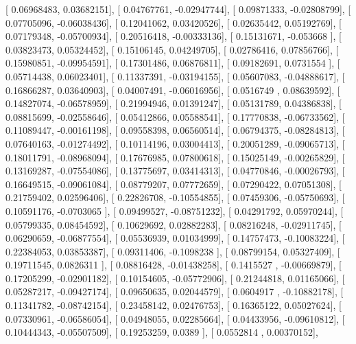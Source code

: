 \documentclass{article}
\begin{document}
       [ 0.06968483,  0.03682151],
       [ 0.04767761, -0.02947744],
       [ 0.09871333, -0.02808799],
       [ 0.07705096, -0.06038436],
       [ 0.12041062,  0.03420526],
       [ 0.02635442,  0.05192769],
       [ 0.07179348, -0.05700934],
       [ 0.20516418, -0.00333136],
       [ 0.15131671, -0.053668  ],
       [ 0.03823473,  0.05324452],
       [ 0.15106145,  0.04249705],
       [ 0.02786416,  0.07856766],
       [ 0.15980851, -0.09954591],
       [ 0.17301486,  0.06876811],
       [ 0.09182691,  0.0731554 ],
       [ 0.05714438,  0.06023401],
       [ 0.11337391, -0.03194155],
       [ 0.05607083, -0.04888617],
       [ 0.16866287,  0.03640903],
       [ 0.04007491, -0.06016956],
       [ 0.0516749 ,  0.08639592],
       [ 0.14827074, -0.06578959],
       [ 0.21994946,  0.01391247],
       [ 0.05131789,  0.04386838],
       [ 0.08815699, -0.02558646],
       [ 0.05412866,  0.05588541],
       [ 0.17770838, -0.06733562],
       [ 0.11089447, -0.00161198],
       [ 0.09558398,  0.06560514],
       [ 0.06794375, -0.08284813],
       [ 0.07640163, -0.01274492],
       [ 0.10114196,  0.03004413],
       [ 0.20051289, -0.09065713],
       [ 0.18011791, -0.08968094],
       [ 0.17676985,  0.07800618],
       [ 0.15025149, -0.00265829],
       [ 0.13169287, -0.07554086],
       [ 0.13775697,  0.03414313],
       [ 0.04770846, -0.00026793],
       [ 0.16649515, -0.09061084],
       [ 0.08779207,  0.07772659],
       [ 0.07290422,  0.07051308],
       [ 0.21759402,  0.02596406],
       [ 0.22826708, -0.10554855],
       [ 0.07459306, -0.05750693],
       [ 0.10591176, -0.0703065 ],
       [ 0.09499527, -0.08751232],
       [ 0.04291792,  0.05970244],
       [ 0.05799335,  0.08454592],
       [ 0.10629692,  0.02882283],
       [ 0.08216248, -0.02911745],
       [ 0.06290659, -0.06877554],
       [ 0.05536939,  0.01034999],
       [ 0.14757473, -0.10083224],
       [ 0.22384053,  0.03853387],
       [ 0.09311406, -0.1098238 ],
       [ 0.08799154,  0.05327409],
       [ 0.19711545,  0.0826311 ],
       [ 0.08816428, -0.01438258],
       [ 0.1415527 , -0.00669879],
       [ 0.17205299, -0.02901182],
       [ 0.10154605, -0.05772906],
       [ 0.21244818,  0.01165066],
       [ 0.05287217, -0.09427174],
       [ 0.09650635,  0.02044579],
       [ 0.0604917 , -0.10882178],
       [ 0.11341782, -0.08742154],
       [ 0.23458142,  0.02476753],
       [ 0.16365122,  0.05027624],
       [ 0.07330961, -0.06586054],
       [ 0.04948055,  0.02285664],
       [ 0.04433956, -0.09610812],
       [ 0.10444343, -0.05507509],
       [ 0.19253259,  0.0389    ],
       [ 0.0552814 ,  0.00370152],
\end{document}
